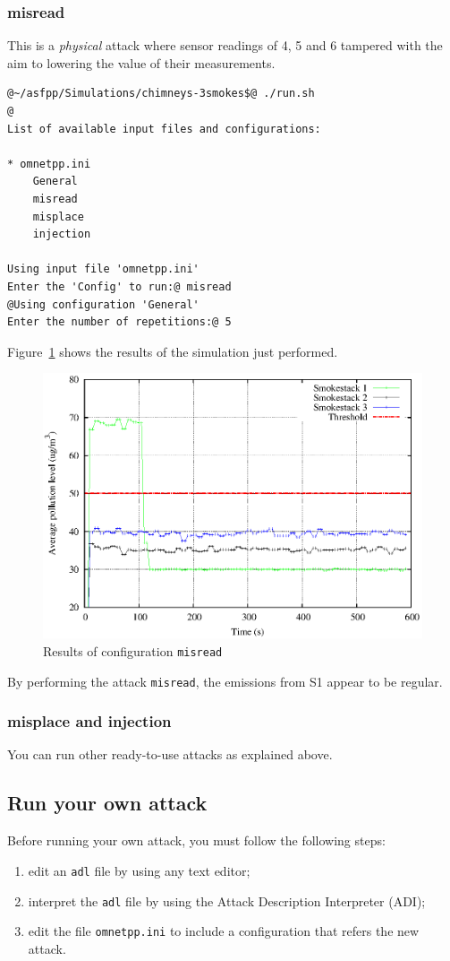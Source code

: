 \subsubsection{misread}
This is a \emph{physical} attack where sensor readings of 4, 5 and 6 tampered with the aim to lowering the value of their measurements.
%
\begin{lstlisting}[language={terminal}]
@~/asfpp/Simulations/chimneys-3smokes$@ ./run.sh
@
List of available input files and configurations:

* omnetpp.ini
	General
	misread
	misplace
	injection

Using input file 'omnetpp.ini'
Enter the 'Config' to run:@ misread
@Using configuration 'General'
Enter the number of repetitions:@ 5
\end{lstlisting}
%
Figure~\ref{fig:misread} shows the results of the simulation just performed.
%
\begin{figure}
\centering
\includegraphics[width=.8\textwidth]{images/raster/misread}
\caption{Results of configuration \texttt{misread}}
\label{fig:misread}
\end{figure} 
%
By performing the attack \texttt{misread}, the emissions from S1 appear to be regular.


\subsubsection{misplace and injection}
You can run other ready-to-use attacks as explained above.



\subsection{Run your own attack}
\label{subsec:run-your-own-attack}
Before running your own attack, you must follow the following steps:
%
\begin{enumerate}
\item edit an \texttt{adl} file by using any text editor;
\item interpret the \texttt{adl} file by using the Attack Description Interpreter (ADI);
\item edit the file \texttt{omnetpp.ini} to include a configuration that refers the new attack.
\end{enumerate}


